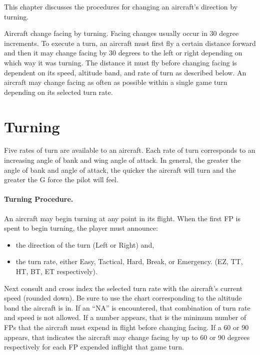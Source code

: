 

This chapter discusses the procedures for changing an aircraft's direction by turning.

Aircraft change facing by turning. Facing changes usually occur in 30 degree increments. To execute a turn, an aircraft must first fly a certain distance forward and then it may change facing by 30 degrees to the left or right depending on which way it was turning. The distance it must fly before changing facing is dependent on its speed, altitude band, and rate of turn as described below. An aircraft may change facing as often as possible within a single game turn depending on its selected turn rate.

\section{Turning}
\label{rule:turning}


Five rates of turn are available to an aircraft. Each rate of turn corresponds to an increasing angle of bank and wing angle of attack. In general, the greater the angle of bank and angle of attack, the quicker the aircraft will turn and the greater the G force the pilot will feel.

\paragraph{Turning Procedure.} 
An aircraft may begin turning at any point in its flight. When the first FP is spent to begin turning, the player must announce:

\begin{itemize}
    \item the direction of the turn (Left or Right) and,
    \item the turn rate, either Easy, Tactical, Hard, Break, or Emergency. (EZ, TT, HT, BT, ET respectively).
\end{itemize}

Next consult  and cross index the selected turn rate with the aircraft's current speed (rounded down). 
Be sure to use the chart corresponding to the altitude band the aircraft is in. If an “NA” is encountered, that combination of turn rate and speed is not allowed. If a number appears, that is the minimum number of FPs that the aircraft must expend in flight before changing facing. If a 60 or 90 appears, that indicates the aircraft may change facing by up to 60 or 90 degrees respectively for each FP expended inflight that game turn. 

